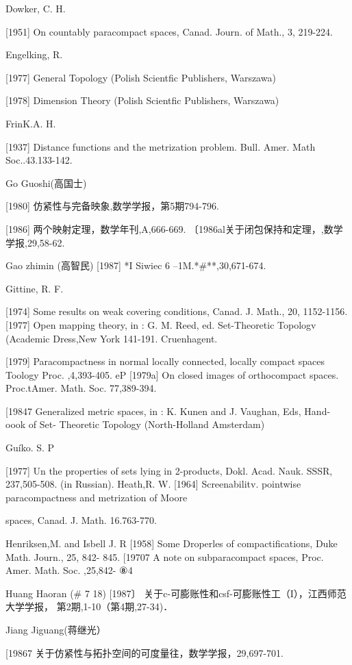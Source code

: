 \documentclass[main.tex]{subfiles}
\begin{document}
\noindent Dowker, C. H.

[1951] On countably paracompact spaces, Canad. Journ. of Math., 3, 219-224.

\noindent Engelking, R.

[1977] General Topology (Polish Scientfic Publishers, Warszawa)

[1978] Dimension Theory (Polish Scientfic Publishers, Warszawa)


\noindent FrinK.A. H.

[1937] Distance functions and the metrization problem. Bull. Amer. Math
Soc..43.133-142.

\noindent Go Guoshi(高国士)

[1980] 仿紧性与完备映象,数学学报，第5期794-796.

[1986] 两个映射定理，数学年刊,A,666-669.
〔1986al关于闭包保持和定理，,数学学报,29,58-62.

\noindent Gao zhimin (高智民)
[1987] *I Siwiec 6 --1M.*\#**,30,671-674.

\noindent Gittine, R. F.

[1974]
Some results on weak covering conditions, Canad. J. Math., 20,
1152-1156.
[1977]
Open mapping theory, in : G. M. Reed, ed. Set-Theoretic Topologv
(Academic Dress,New York 141-191.
Cruenhagent.

[1979]
Paracompactness in normal locally connected,
locally compact
spaces Toology Proc.
,4,393-405.
eP [1979a]
On closed images of orthocompact
spaces. Proc.tAmer. Math. Soc.
77,389-394.

[19847 Generalized metric spaces, in : K. Kunen and J. Vaughan, Eds, Hand-
oook of Set- Theoretic Topology (North-Holland Amsterdam)

Guíko. S. P

[1977]
Un
the properties of sets lying in 2-products, Dokl. Acad. Nauk.
SSSR, 237,505-508. (in Russian).
Heath,R. W.
[1964]
Screenabilitv. pointwise paracompactness and
metrization of Moore

spaces, Canad. J. Math. 16.763-770.

\noindent Henriksen,M. and Isbell J. R
[1958]
Some Droperles
of compactifications, Duke Math. Journ., 25, 842-
845.
[19707 A note on subparacompact spaces, Proc. Amer. Math. Soc. ,25,842-
⑧4

\noindent Huang Haoran (# 7 18)
[1987〕 关于c-可膨账性和csf-可膨账性工（I），江西师范大学学报，
第2期,1-10（第4期,27-34)．

\noindent Jiang Jiguang(蒋继光）

[19867 关于仿紧性与拓扑空间的可度量往，数学学报，29,697-701.
\end{document}

